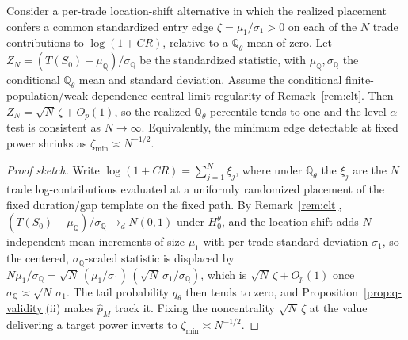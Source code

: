 \begin{proposition}
\label{prop:consistency}
Consider a per-trade location-shift alternative in which the realized placement
confers a common standardized entry edge $\zeta=\mu_1/\sigma_1>0$ on each of the
$N$ trade contributions to $\log(1+CR)$, relative to a $\mathbb{Q}_\theta$-mean of
zero. Let $Z_N=(T(S_0)-\mu_{\mathbb Q})/\sigma_{\mathbb Q}$ be the standardized
statistic, with $\mu_{\mathbb Q},\sigma_{\mathbb Q}$ the conditional
$\mathbb{Q}_\theta$ mean and standard deviation. Assume the conditional
finite-population/weak-dependence central limit regularity of
Remark~\ref{rem:clt}. Then $Z_N=\sqrt N\,\zeta+O_p(1)$, so the realized
$\mathbb{Q}_\theta$-percentile tends to one and the level-$\alpha$ test is
consistent as $N\to\infty$. Equivalently, the minimum edge detectable at fixed
power shrinks as $\zeta_{\min}\asymp N^{-1/2}$.
\end{proposition}

\begin{proof}[Proof sketch]
Write $\log(1+CR)=\sum_{j=1}^{N}\xi_j$, where under $\mathbb{Q}_\theta$ the $\xi_j$
are the $N$ trade log-contributions evaluated at a uniformly randomized placement
of the fixed duration/gap template on the fixed path. By
Remark~\ref{rem:clt}, $(T(S_0)-\mu_{\mathbb Q})/\sigma_{\mathbb Q}\to_d N(0,1)$
under $H_0^\theta$, and the location shift adds $N$ independent mean increments of
size $\mu_1$ with per-trade standard deviation $\sigma_1$, so the centered,
$\sigma_{\mathbb Q}$-scaled statistic is displaced by $N\mu_1/\sigma_{\mathbb
Q}=\sqrt N\,(\mu_1/\sigma_1)\,(\sqrt N\,\sigma_1/\sigma_{\mathbb Q})$, which is
$\sqrt N\,\zeta+O_p(1)$ once $\sigma_{\mathbb Q}\asymp\sqrt N\,\sigma_1$. The tail
probability $q_\theta$ then tends to zero, and Proposition~\ref{prop:q-validity}(ii)
makes $\hat p_M$ track it. Fixing the noncentrality $\sqrt N\,\zeta$ at the value
delivering a target power inverts to $\zeta_{\min}\asymp N^{-1/2}$.
\end{proof}

